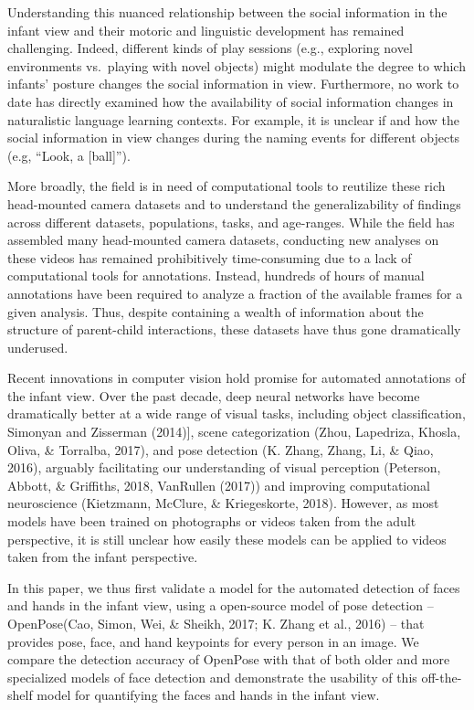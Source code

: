 \documentclass[english,man]{apa6}
\begin{document}
Understanding this nuanced relationship between the social information
in the infant view and their motoric and linguistic development has
remained challenging. Indeed, different kinds of play sessions (e.g.,
exploring novel environments vs.~playing with novel objects) might
modulate the degree to which infants' posture changes the social
information in view. Furthermore, no work to date has directly examined
how the availability of social information changes in naturalistic
language learning contexts. For example, it is unclear if and how the
social information in view changes during the naming events for
different objects (e.g, \enquote{Look, a {[}ball{]}}).

More broadly, the field is in need of computational tools to reutilize
these rich head-mounted camera datasets and to understand the
generalizability of findings across different datasets, populations,
tasks, and age-ranges. While the field has assembled many head-mounted
camera datasets, conducting new analyses on these videos has remained
prohibitively time-consuming due to a lack of computational tools for
annotations. Instead, hundreds of hours of manual annotations have been
required to analyze a fraction of the available frames for a given
analysis. Thus, despite containing a wealth of information about the
structure of parent-child interactions, these datasets have thus gone
dramatically underused.

Recent innovations in computer vision hold promise for automated
annotations of the infant view. Over the past decade, deep neural
networks have become dramatically better at a wide range of visual
tasks, including object classification, Simonyan and Zisserman
(2014){]}, scene categorization (Zhou, Lapedriza, Khosla, Oliva, \&
Torralba, 2017), and pose detection (K. Zhang, Zhang, Li, \& Qiao,
2016), arguably facilitating our understanding of visual perception
(Peterson, Abbott, \& Griffiths, 2018, VanRullen (2017)) and improving
computational neuroscience (Kietzmann, McClure, \& Kriegeskorte, 2018).
However, as most models have been trained on photographs or videos taken
from the adult perspective, it is still unclear how easily these models
can be applied to videos taken from the infant perspective.

In this paper, we thus first validate a model for the automated
detection of faces and hands in the infant view, using a open-source
model of pose detection -- OpenPose(Cao, Simon, Wei, \& Sheikh, 2017; K.
Zhang et al., 2016) -- that provides pose, face, and hand keypoints for
every person in an image. We compare the detection accuracy of OpenPose
with that of both older and more specialized models of face detection
and demonstrate the usability of this off-the-shelf model for
quantifying the faces and hands in the infant view.
\end{document}
